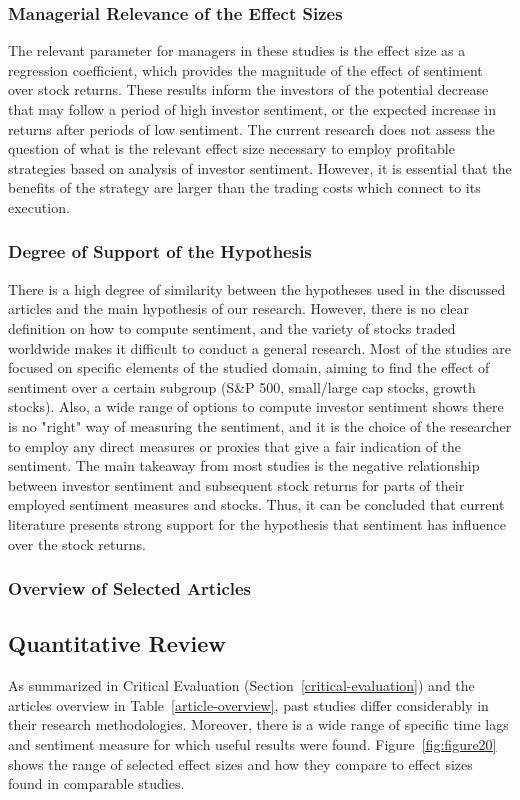 \subsubsection{Managerial Relevance of the Effect Sizes}
The relevant parameter for managers in these studies is the effect size as a regression coefficient, which provides the magnitude of the effect of sentiment over stock returns. These results inform the investors of the potential decrease that may follow a period of high investor sentiment, or the expected increase in returns after periods of low sentiment. The current research does not assess the question of what is the relevant effect size necessary to employ profitable strategies based on analysis of investor sentiment. However, it is essential that the benefits of the strategy are larger than the trading costs which connect to its execution.

\subsubsection{Degree of Support of the Hypothesis}
There is a high degree of similarity between the hypotheses used in the discussed articles and the main hypothesis of our research. However, there is no clear definition on how to compute sentiment, and the variety of stocks traded worldwide makes it  difficult to conduct a general research. Most of the studies are focused on specific elements of the studied domain, aiming to find the effect of sentiment over a certain subgroup (S\&P 500, small/large cap stocks, growth stocks). Also, a wide range of options to compute investor sentiment shows there is no "right" way of measuring the sentiment, and it is the choice of the researcher to employ any direct measures or proxies that give a fair indication of the sentiment. The main takeaway from most studies is the negative relationship between investor sentiment and subsequent stock returns for parts of their employed sentiment measures and stocks. Thus, it can be concluded that current literature presents strong support for the hypothesis that sentiment has influence over the stock returns.

\subsubsection{Overview of Selected Articles}



\subsection{Quantitative Review}
As summarized in Critical Evaluation (Section~\ref{critical-evaluation}) and the articles overview in Table~\ref{article-overview}, past studies differ considerably in their research methodologies. Moreover, there is a wide range of specific time lags and sentiment measure for which useful results were found. Figure~\ref{fig:figure20} shows the range of selected effect sizes and how they compare to effect sizes found in comparable studies.


